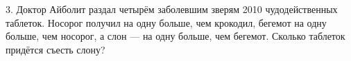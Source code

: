 3. Доктор Айболит раздал четырём заболевшим зверям 2010 чудодейственных таблеток. Носорог получил на одну больше, чем крокодил, бегемот на одну больше, чем носорог, а слон --- на одну больше, чем бегемот. Сколько таблеток придётся съесть слону?\\
